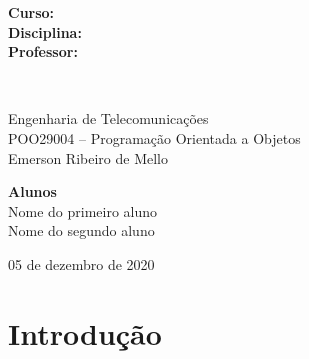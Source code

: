 \documentclass[11pt]{../../classes/univaliarticle}
\begin{document}
\begin{titlepage}
\begin{minipage}{.9\linewidth}
        \begin{minipage}{0.15\textwidth}
            \begin{flushleft} \large
                \textbf{Curso:}\\
                \textbf{Disciplina:}\\
                \textbf{Professor:}
            \end{flushleft}
        \end{minipage}~
        \begin{minipage}{0.8\textwidth}
            \begin{flushleft} \large
                Engenharia de Telecomunicações\\
                POO29004 -- Programação Orientada a Objetos\\
                Emerson Ribeiro de Mello
            \end{flushleft}
        \end{minipage}
    \end{minipage}
    \vspace{3cm}

    \begin{minipage}{.9\linewidth}
        \begin{flushright}
            \textbf{Alunos}\\
            Nome do primeiro aluno\\
            Nome do segundo aluno
        \end{flushright}
    \end{minipage}
    \vfill


    \begin{center}
        05 de dezembro de 2020
    \end{center}

\end{titlepage}
\pagestyle{firstpage}



\section{Introdução}
\label{sec:introducao}
\end{document}
